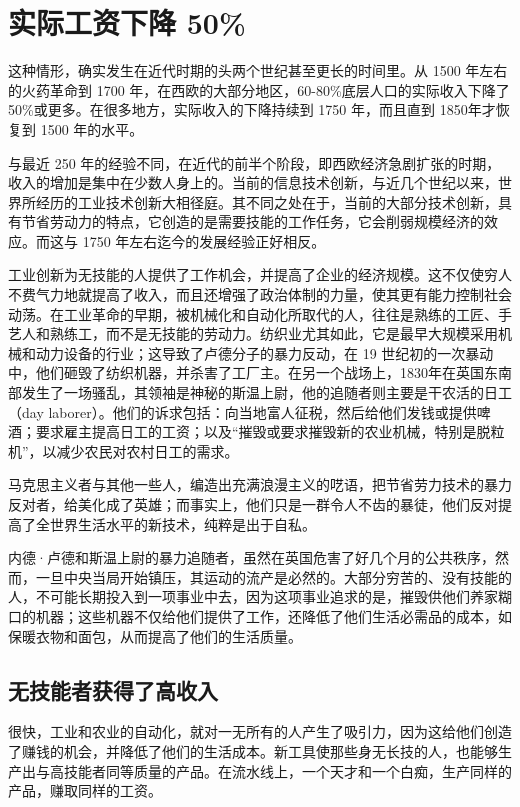 \section{实际工资下降 50\%}
这种情形，确实发生在近代时期的头两个世纪甚至更长的时间里。从 1500 年左右的火药革命到 1700 年，在西欧的大部分地区，60-80\%底层人口的实际收入下降了 50\%或更多。在很多地方，实际收入的下降持续到 1750 年，而且直到 1850年才恢复到 1500 年的水平。

与最近 250 年的经验不同，在近代的前半个阶段，即西欧经济急剧扩张的时期，收入的增加是集中在少数人身上的。当前的信息技术创新，与近几个世纪以来，世界所经历的工业技术创新大相径庭。其不同之处在于，当前的大部分技术创新，具有节省劳动力的特点，它创造的是需要技能的工作任务，它会削弱规模经济的效应。而这与 1750 年左右迄今的发展经验正好相反。

工业创新为无技能的人提供了工作机会，并提高了企业的经济规模。这不仅使穷人不费气力地就提高了收入，而且还增强了政治体制的力量，使其更有能力控制社会动荡。在工业革命的早期，被机械化和自动化所取代的人，往往是熟练的工匠、手艺人和熟练工，而不是无技能的劳动力。纺织业尤其如此，它是最早大规模采用机械和动力设备的行业；这导致了卢德分子的暴力反动，在 19 世纪初的一次暴动中，他们砸毁了纺织机器，并杀害了工厂主。在另一个战场上，1830年在英国东南部发生了一场骚乱，其领袖是神秘的斯温上尉，他的追随者则主要是干农活的日工（day laborer）。他们的诉求包括：向当地富人征税，然后给他们发钱或提供啤酒；要求雇主提高日工的工资；以及“摧毁或要求摧毁新的农业机械，特别是脱粒机”，以减少农民对农村日工的需求。

马克思主义者与其他一些人，编造出充满浪漫主义的呓语，把节省劳力技术的暴力反对者，给美化成了英雄；而事实上，他们只是一群令人不齿的暴徒，他们反对提高了全世界生活水平的新技术，纯粹是出于自私。

内德·卢德和斯温上尉的暴力追随者，虽然在英国危害了好几个月的公共秩序，然而，一旦中央当局开始镇压，其运动的流产是必然的。大部分穷苦的、没有技能的人，不可能长期投入到一项事业中去，因为这项事业追求的是，摧毁供他们养家糊口的机器；这些机器不仅给他们提供了工作，还降低了他们生活必需品的成本，如保暖衣物和面包，从而提高了他们的生活质量。

\subsection{无技能者获得了高收入}
很快，工业和农业的自动化，就对一无所有的人产生了吸引力，因为这给他们创造了赚钱的机会，并降低了他们的生活成本。新工具使那些身无长技的人，也能够生产出与高技能者同等质量的产品。在流水线上，一个天才和一个白痴，生产同样的产品，赚取同样的工资。

